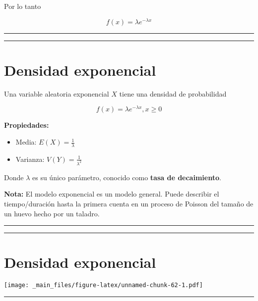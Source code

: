 \documentclass[
]{book}
\providecommand{\tightlist}{%
  \setlength{\itemsep}{0pt}\setlength{\parskip}{0pt}}
\begin{document}
Por lo tanto

\[f(x)=\lambda e^{-\lambda x}\]

\begin{center}\rule{0.5\linewidth}{0.5pt}\end{center}

\begin{center}\rule{0.5\linewidth}{0.5pt}\end{center}

\hypertarget{densidad-exponencial-3}{%
\section{Densidad exponencial}\label{densidad-exponencial-3}}

Una variable aleatoria exponencial \(X\) tiene una densidad de probabilidad

\[f(x)=\lambda e^{-\lambda x}, x\geq 0\]

\textbf{Propiedades:}

\begin{itemize}
\tightlist
\item
  Media: \(E(X)=\frac{1}{\lambda}\)
\item
  Varianza: \(V(Y)=\frac{1}{\lambda^2}\)
\end{itemize}

Donde \(\lambda\) es su único parámetro, conocido como \textbf{tasa de decaimiento}.

\textbf{Nota:} El modelo exponencial es un modelo general. Puede describir el tiempo/duración hasta la primera cuenta en un proceso de Poisson del tamaño de un huevo hecho por un taladro.

\begin{center}\rule{0.5\linewidth}{0.5pt}\end{center}

\begin{center}\rule{0.5\linewidth}{0.5pt}\end{center}

\hypertarget{densidad-exponencial-4}{%
\section{Densidad exponencial}\label{densidad-exponencial-4}}

\texttt{[image: \_main\_files/figure-latex/unnamed-chunk-62-1.pdf]}

\begin{center}\rule{0.5\linewidth}{0.5pt}\end{center}
\end{document}
